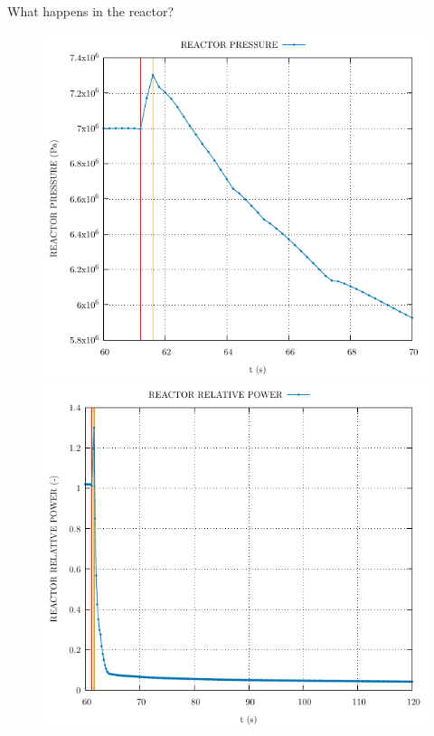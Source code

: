 \begin{frame}{What happens in the reactor?}
\begin{figure}
\begin{minipage}{.5\textwidth}
		\end{minipage}
	\end{figure}
	\vspace{-10pt}
	\begin{figure}
		\centering
		\begin{minipage}{.5\textwidth}
			\centering
			\includegraphics[width=0.7\linewidth]{./graphs/REACTOR PRESSURE_start.pdf}
		\end{minipage}%
		\begin{minipage}{.5\textwidth}
			\centering
			\includegraphics[width=.7\linewidth]{./graphs/REACTOR RELATIVE POWER.pdf}
		\end{minipage}
	\end{figure}
\end{frame}


